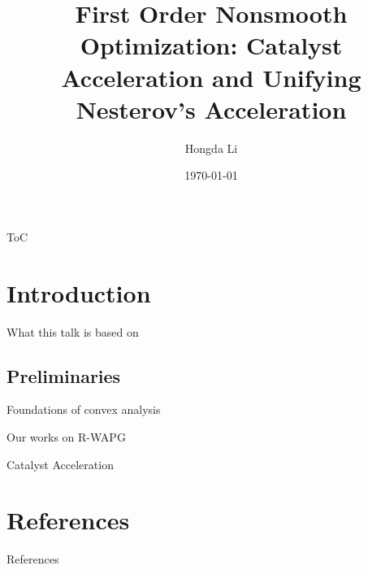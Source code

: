 \documentclass[11pt]{beamer}
\author{Hongda Li}
\title{First Order Nonsmooth Optimization: Catalyst Acceleration and Unifying Nesterov's Acceleration}
\institute[]{
    University of British Columbia Okanagan
}
\date{\today}
\begin{document}
\begin{frame}
    \titlepage
\end{frame}

\begin{frame}{ToC}
    \tableofcontents
\end{frame}

    

\section{Introduction}
    \begin{frame}{What this talk is based on}

        
    \end{frame}
    \subsection{Preliminaries}
        \begin{frame}{Foundations of convex analysis}
            
        \end{frame}
        \begin{frame}{Our works on R-WAPG}
            
        \end{frame}
        \begin{frame}{Catalyst Acceleration}
            
        \end{frame}


\section{References}
    \begin{frame}[allowframebreaks]{References}
        
    \end{frame}
\end{document}
